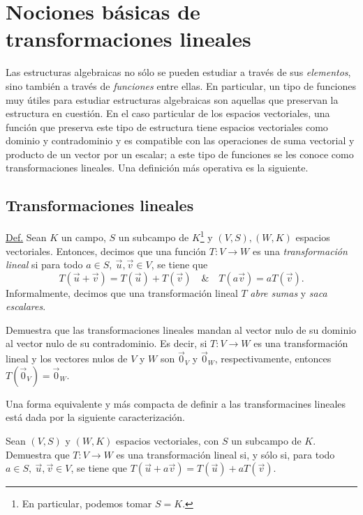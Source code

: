 \documentclass[apuntes]{subfiles}
\begin{document}
\section{Nociones básicas de transformaciones lineales} \label{Sec: Nociones básicas de transformaciones lineales}

Las estructuras algebraicas no sólo se pueden estudiar a través de sus \emph{elementos}, sino también a través de \emph{funciones} entre ellas. En particular, un tipo de funciones muy útiles para estudiar estructuras algebraicas son aquellas que preservan la estructura en cuestión. En el caso particular de los espacios vectoriales, una función que preserva este tipo de estructura tiene espacios vectoriales como dominio y contradominio y es compatible con las operaciones de suma vectorial y producto de un vector por un escalar; a este tipo de funciones se les conoce como transformaciones lineales. Una definición más operativa es la siguiente.

\subsection*{Transformaciones lineales} \label{Ssec: Definición de transformación lineal}

\begin{tcolorbox}
\underline{Def.} Sean $K$ un campo, $S$ un subcampo de $K$\footnote{En particular, podemos tomar $S=K$.} y $(V,S), (W,K)$ espacios vectoriales. Entonces, decimos que una función $T:V\to W$ es una \emph{transformación lineal} si para todo $a\in S, \ \vec{u},\vec{v}\in V$, se tiene que
\[
T(\vec{u}+\vec{v}) = T(\vec{u})+T(\vec{v}) \quad \& \quad T(a\vec{v}) = aT(\vec{v}).
\]
Informalmente, decimos que una transformación lineal $T$ \emph{abre sumas} y \emph{saca escalares}.
\end{tcolorbox}

\begin{ejer}\label{ejer-16}
    Demuestra que las transformaciones lineales mandan al vector nulo de su dominio al vector nulo de su contradominio. Es decir, si $T:V\to W$ es una transformación lineal y los vectores nulos de $V$ y $W$ son $\vec{0}_V$ y $\vec{0}_W$, respectivamente, entonces $T(\vec{0}_V) = \vec{0}_W$.
\end{ejer}

Una forma equivalente y más compacta de definir a las transformacines lineales está dada por la siguiente caracterización.

\begin{ejer}\label{ejer:17}
Sean $(V,S)$ y $(W,K)$ espacios vectoriales, con $S$ un subcampo de $K$. Demuestra que $T:V\to W$ es una transformación lineal si, y sólo si, para todo $a\in S, \ \vec{u},\vec{v}\in V$, se tiene que $T(\vec{u}+a\vec{v}) = T(\vec{u})+aT(\vec{v})$.
\end{ejer}
\end{document}
